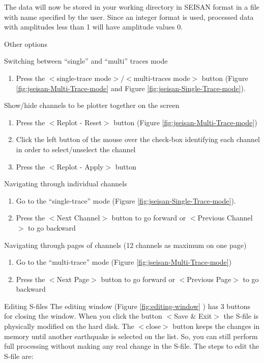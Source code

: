 The data will now be stored in your working directory in SEISAN format in a file with name specified by the user. Since an integer format is used, processed data with amplitudes less than 1 will have amplitude values 0. 

Other options 

Switching between ``single'' and ``multi'' traces mode 

\begin{enumerate}
\item
Press the $<$single-trace mode$>$/$<$multi-traces mode$>$ button 
(Figure \ref{fig:jseisan-Multi-Trace-mode} and Figure \ref{fig:jseisan-Single-Trace-mode}). 
\end{enumerate}

Show/hide channels to be plotter together on the screen 

\begin{enumerate}
\item
 Press the $<$Replot - Reset$>$ button (Figure \ref{fig:jseisan-Multi-Trace-mode}) 
\item
 Click the left button of the mouse over the check-box identifying each channel in order to select/unselect the channel 
\item
 Press the $<$Replot - Apply$>$ button 
\end{enumerate}


Navigating through individual channels \newline
\begin{enumerate}
\item
 Go to the ``single-trace'' mode (Figure \ref{fig:jseisan-Single-Trace-mode}). 
\item
 Press the $<$Next Channel$>$ button to go forward or $<$Previous Channel$>$ to go backward 
\end{enumerate}


Navigating through pages of channels (12 channels as maximum on one page) \newline
\begin{enumerate}
\item
 Go to the ``multi-trace'' mode (Figure \ref{fig:jseisan-Multi-Trace-mode}) 
\item
 Press the $<$Next Page$>$ button to go forward or $<$Previous Page$>$ to go backward 
\end{enumerate}


Editing S-files\newline
The editing window (Figure 
\ref{fig:editing-window}
) has 3 buttons for closing the window. When you click the button $<$Save \& Exit$>$ the S-file is physically modified on the hard disk. The $<$close$>$ button keeps the changes in memory until another earthquake is selected on the list. So, you can still perform full processing without making any real change in the S-file. The steps to edit the S-file are: 

